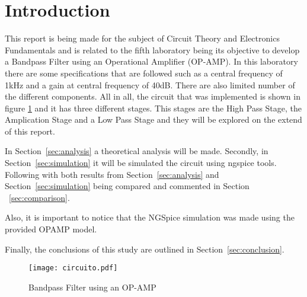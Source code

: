 \section{Introduction}
\label{sec:introduction}


\hspace{0,5cm} This report is being made for the subject of Circuit Theory and Electronics Fundamentals and is related to the fifth laboratory being its objective to develop a Bandpass Filter using an Operational Amplifier (OP-AMP). In this laboratory there are some specifications that are followed such as a central frequency of 1kHz and a gain at central frequency of 40dB. There are also limited number of the different components. All in all, the circuit that was implemented is shown in figure \ref{fig:circuito} and it has three different stages. This stages are the High Pass Stage, the Amplication Stage and a Low Pass Stage and they will be explored on the extend of this report.
\par In Section~\ref{sec:analysis} a theoretical analysis will be made. Secondly, in Section~\ref{sec:simulation} it will be simulated the circuit using ngspice tools. Following with both results from Section~\ref{sec:analysis} and Section~\ref{sec:simulation} being compared and commented in Section ~\ref{sec:comparison}. 
\par Also, it is important to notice that the NGSpice simulation was made using the provided OPAMP model.
\par Finally, the conclusions of this study are outlined in Section~\ref{sec:conclusion}.

\begin{figure}[H] \centering
\texttt{[image: circuito.pdf]}
\caption{Bandpass Filter using an OP-AMP}
\label{fig:circuito}
\end{figure}



